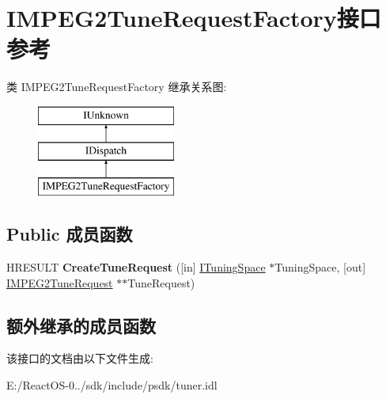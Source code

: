 \hypertarget{interface_i_m_p_e_g2_tune_request_factory}{}\section{I\+M\+P\+E\+G2\+Tune\+Request\+Factory接口 参考}
\label{interface_i_m_p_e_g2_tune_request_factory}
类 I\+M\+P\+E\+G2\+Tune\+Request\+Factory 继承关系图\+:\begin{figure}[H]
\begin{center}
\leavevmode
\includegraphics[height=3.000000cm]{interface_i_m_p_e_g2_tune_request_factory}
\end{center}
\end{figure}
\subsection*{Public 成员函数}
\begin{DoxyCompactItemize}
\item 
\mbox{\label{interface_i_m_p_e_g2_tune_request_factory_a77d62fbd0594014ff9a2e1ca6c7995fa}} 
H\+R\+E\+S\+U\+LT {\bfseries Create\+Tune\+Request} (\mbox{[}in\mbox{]} \hyperlink{interface_i_tuning_space}{I\+Tuning\+Space} $\ast$Tuning\+Space, \mbox{[}out\mbox{]} \hyperlink{interface_i_m_p_e_g2_tune_request}{I\+M\+P\+E\+G2\+Tune\+Request} $\ast$$\ast$Tune\+Request)
\end{DoxyCompactItemize}
\subsection*{额外继承的成员函数}


该接口的文档由以下文件生成\+:\begin{DoxyCompactItemize}
\item 
E\+:/\+React\+O\+S-\/0../sdk/include/psdk/tuner.\+idl\end{DoxyCompactItemize}
